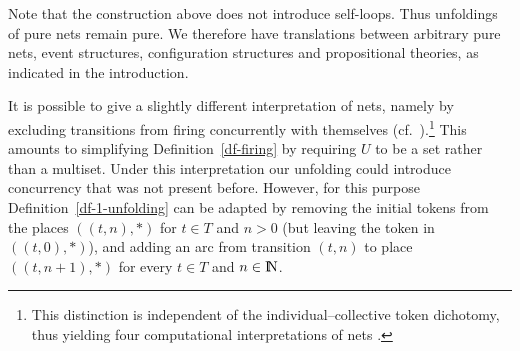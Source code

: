 \documentclass[twocolumn]{article}
\newcommand{\df}[1]{Definition~\ref{df-#1}}
\newcommand{\dl}[1]{\mbox{\rm I\hspace{-0.75mm}#1}}     \newcommand{\dc}[1]{\mbox{\rm {\raisebox{.4ex}{\makebox [0pt][l]{\hspace{.2em}\scriptsize $\mid$}}}#1}}
\newcommand{\IN}{\dl{N}}                        \newcommand{\IQ}{\dc{Q}}                        \newcommand{\IC}{\dc{C}}                        \newcommand{\IE}{\dl{E}}                        \newcommand{\IG}{\dc{G}}                        \newcommand{\fC}{{\cal C}}                      \newcommand{\fE}{{\cal E}}                      \newcommand{\fG}{{\cal G}}                      \newcommand{\fN}{{\cal N}}                      \newcommand{\fF}{{\cal F}}                      \newcommand{\fL}{{\cal L}}                      \newcommand{\fM}{{\cal M}}                      \newcommand{\fS}{{\cal S}}                      \newcommand{\fR}{{\cal R}}                      \newcommand{\eC}{{\rm C}}                       \newcommand{\eD}{{\rm D}}                       \newcommand{\eE}{{\rm E}}                       \newcommand{\eF}{{\rm F}}                       \newcommand{\eG}{{\rm G}}                       \newcommand{\eH}{{\rm H}}                       \newcommand{\eK}{{\rm K}}                       \newcommand{\eL}{{\rm L}}                       \newcommand{\eN}{{\rm N}}                       \newcommand{\eP}{{\rm P}}                       \newcommand{\eM}{{\rm M}}                       \newcommand{\eT}{{\rm T}}                       \newcommand{\fT}{{\cal T}}
\begin{document}
Note that the construction above does not introduce self-loops. Thus
unfoldings of pure nets remain pure.
We therefore have translations between arbitrary pure nets, event
structures, configuration structures and propositional theories, as
indicated in the introduction.

It is possible to give a slightly different interpretation of nets,
namely by excluding transitions from firing concurrently with
themselves (cf.\ \cite{GR83}).\footnote{This distinction is
independent of the individual--collective token dichotomy, thus
yielding four computational interpretations of nets \cite{vG05}.}
This amounts to simplifying \df{firing} by requiring $U$ to be a set
rather than a multiset. Under this interpretation our unfolding
could introduce concurrency that was not present before. However, for
this purpose \df{1-unfolding} can be adapted by removing the initial
tokens from the places $((t,n),*)$ for $t\in T$ and $n>0$ (but leaving
the token in $((t,0),*)$), and adding an arc from transition $(t,n)$
to place $((t,n+1),*)$ for every $t\in T$ and $n \in \IN$.
\end{document}
